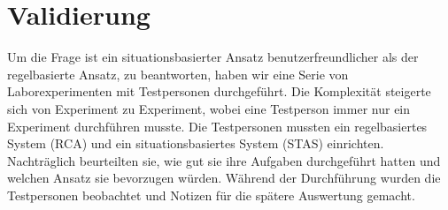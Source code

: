 %
\section{Validierung}
Um die Frage \glqq ist ein situationsbasierter Ansatz benutzerfreundlicher als der regelbasierte Ansatz\grqq, zu beantworten, haben wir eine Serie von Laborexperimenten mit Testpersonen durchgeführt. Die Komplexität steigerte sich von Experiment zu Experiment, wobei eine Testperson immer nur ein Experiment durchführen musste. Die Testpersonen mussten ein regelbasiertes System (RCA) und ein situationsbasiertes System (STAS) einrichten. Nachträglich beurteilten sie, wie gut sie ihre Aufgaben durchgeführt hatten und welchen Ansatz sie bevorzugen würden. Während der Durchführung wurden die Testpersonen beobachtet und Notizen für die spätere Auswertung gemacht.
